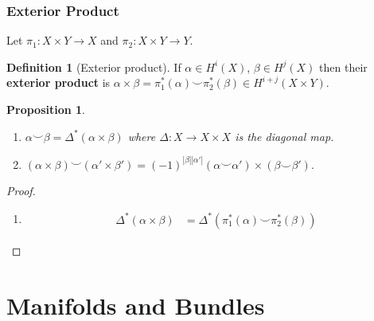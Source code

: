 \documentclass[10pt,]{book}
\newcommand{\terminology}[1]{\textbf{#1}}
\theoremstyle{plain}
\newtheorem{proposition}[theorem]{Proposition}
\theoremstyle{definition}
\newtheorem{definition}[theorem]{Definition}
\numberwithin{equation}{section}
\begin{document}
\subsection[Exterior Product]{Exterior Product}\label{subsection-12}
Let \(\pi_1 \colon X\times Y \to X\) and \(\pi_2 \colon X \times Y \to Y\).%
\begin{definition}[Exterior product]\label{definition-27}
If \(\alpha \in H^i(X)\), \(\beta\in H^j(X)\) then their \terminology{exterior product} is \(\alpha\times \beta = \pi_1^*(\alpha) \smile \pi_2^*(\beta) \in H^{i+j}(X\times Y)\).
            \end{definition}
\begin{proposition}\label{proposition-6}
\begin{enumerate}
\item{}\(\alpha\smile \beta = \Delta^*(\alpha\times \beta)\) where \(\Delta\colon X \to X\times X\) is the diagonal map.\item{}\((\alpha\times\beta)\smile (\alpha' \times \beta') = (-1)^{|\beta||\alpha'|}(\alpha \smile \alpha')\times(\beta \smile \beta').\)\end{enumerate}
\end{proposition}
\begin{proof}
\begin{enumerate}
\item{}
                  \begin{align*}
\Delta^*(\alpha\times\beta) &= \Delta^*(\pi_1^*(\alpha) \smile \pi_2^*(\beta))
\end{align*}
                \end{enumerate}
\end{proof}
\typeout{************************************************}
\typeout{************************************************}
\chapter[Manifolds and Bundles]{Manifolds and Bundles}\label{chap-manifolds-bundles}
\typeout{************************************************}
\typeout{************************************************}
\end{document}
